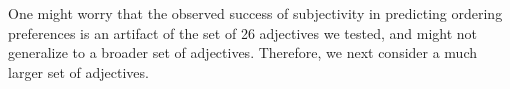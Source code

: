 \documentclass[manuscript]{stjour}
\begin{document}
One might worry that the observed success of subjectivity in predicting ordering preferences is an artifact of the set of 26 adjectives we %
tested, and might not generalize to a broader set of adjectives. Therefore, we next consider a much larger set of adjectives. 




%
\end{document}
